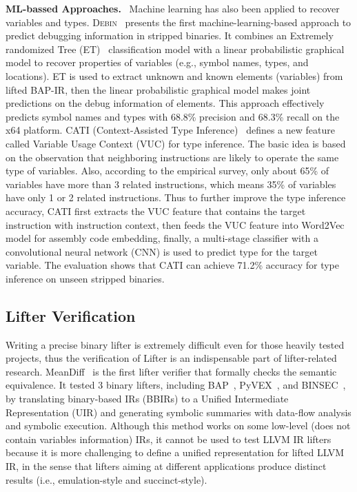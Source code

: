 \noindent\textbf{ML-bassed Approaches.}~
Machine learning has also been applied to recover variables and types. \textsc{Debin}~\cite{he2018debin} presents the first machine-learning-based approach to predict debugging information in stripped binaries. It combines an Extremely randomized Tree (ET)~\cite{geurts2006extremely} classification model with a linear probabilistic graphical model to recover properties of variables (e.g., symbol names, types, and locations). ET is used to extract unknown and known elements (variables) from lifted BAP-IR, then the linear probabilistic graphical model makes joint predictions on the debug information of elements. This approach effectively predicts symbol names and types with 68.8\% precision and 68.3\% recall on the x64 platform.
CATI (Context-Assisted Type Inference)~\cite{chen2020cati} defines a new feature called Variable Usage Context (VUC) for type inference. The basic idea is based on the observation that neighboring instructions are likely to operate the same type of variables. Also, according to the empirical survey, only about 65\% of variables have more than 3 related instructions, which means 35\% of variables have only 1 or 2 related instructions. Thus to further improve the type inference accuracy, CATI first extracts the VUC feature that contains the target instruction with instruction context, then feeds the VUC feature into Word2Vec~\cite{mikolov2013distributed} model for assembly code embedding, finally, a multi-stage classifier with a convolutional neural network (CNN) is used to predict type for the target variable. The evaluation shows that CATI can achieve 71.2\% accuracy for type inference on unseen stripped binaries.


\subsection{Lifter Verification} \label{sec:existing-lifter-verfication}
Writing a precise binary lifter is extremely difficult even for those heavily tested projects, thus the verification of Lifter is an indispensable part of lifter-related research.
MeanDiff~\cite{kim2017testing} is the first lifter verifier that formally checks the semantic equivalence. It tested 3 binary lifters, including BAP~\cite{brumley2011bap}, PyVEX~\cite{pyvex}, and BINSEC~\cite{bardin2011bincoa}, by translating binary-based IRs (BBIRs) to a Unified Intermediate Representation (UIR) and generating symbolic summaries with data-flow analysis and symbolic execution. Although this method works on some low-level (does not contain variables information) IRs, it cannot be used to test LLVM IR lifters because it is more challenging to define a unified representation for lifted LLVM IR, in the sense that lifters aiming at different applications produce distinct results (i.e., emulation-style and succinct-style).

